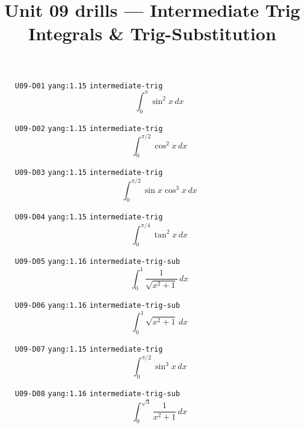 
\title{Unit 09 drills --- Intermediate Trig Integrals \& Trig-Substitution}

\maketitle
\begin{enumerate}
\item[\texttt{U09-D01}] \texttt{yang:1.15} \texttt{intermediate-trig}
\[ \int_0^{\pi}\sin^2 x\,dx \]
\item[\texttt{U09-D02}] \texttt{yang:1.15} \texttt{intermediate-trig}
\[ \int_0^{\pi/2}\cos^2 x\,dx \]
\item[\texttt{U09-D03}] \texttt{yang:1.15} \texttt{intermediate-trig}
\[ \int_0^{\pi/2}\sin x\cos^3 x\,dx \]
\item[\texttt{U09-D04}] \texttt{yang:1.15} \texttt{intermediate-trig}
\[ \int_0^{\pi/4}\tan^2 x\,dx \]
\item[\texttt{U09-D05}] \texttt{yang:1.16} \texttt{intermediate-trig-sub}
\[ \int_0^1\frac{1}{\sqrt{x^2+1}}\,dx \]
\item[\texttt{U09-D06}] \texttt{yang:1.16} \texttt{intermediate-trig-sub}
\[ \int_0^1\sqrt{x^2+1}\,dx \]
\item[\texttt{U09-D07}] \texttt{yang:1.15} \texttt{intermediate-trig}
\[ \int_0^{\pi/2}\sin^3 x\,dx \]
\item[\texttt{U09-D08}] \texttt{yang:1.16} \texttt{intermediate-trig-sub}
\[ \int_0^{\sqrt{3}}\frac{1}{x^2+1}\,dx \]
\end{enumerate}

